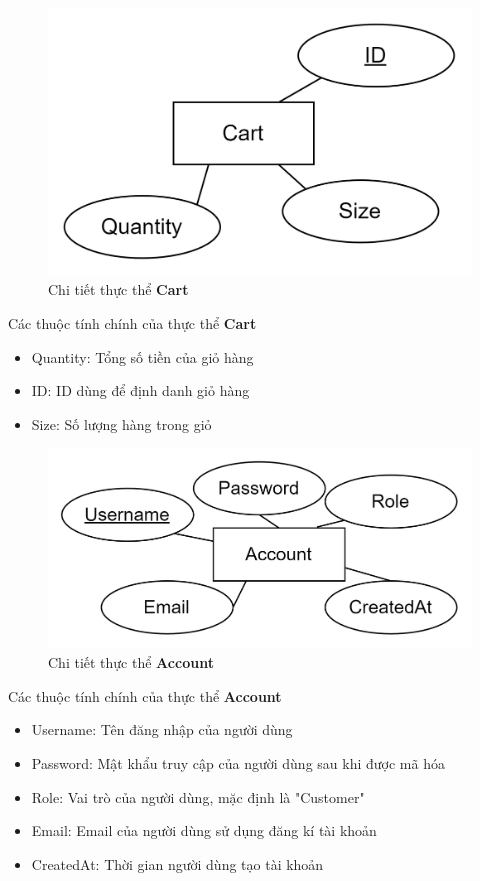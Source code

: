 \begin{figure}[h]
    \centering
    \includegraphics[scale = 0.20]{img/db/cart.png}
    \vspace{1cm}
    \caption{Chi tiết thực thể \textbf{Cart}}
    \label{fig:taskAssignment}
\end{figure}
Các thuộc tính chính của thực thể \textbf{Cart}
\begin{itemize}
    \item Quantity: Tổng số tiền của giỏ hàng
    \item ID: ID dùng để định danh giỏ hàng
    \item Size: Số lượng hàng trong giỏ
\end{itemize}


\begin{figure}[h]
    \centering
    \includegraphics[scale = 0.20]{img/db/account.png}
    \vspace{1cm}
    \caption{Chi tiết thực thể \textbf{Account}}
    \label{fig:taskAssignment}
\end{figure}
Các thuộc tính chính của thực thể \textbf{Account}
\begin{itemize}
    \item Username: Tên đăng nhập của người dùng
    \item Password: Mật khẩu truy cập của người dùng sau khi được mã hóa
    \item Role: Vai trò của người dùng, mặc định là "Customer"
    \item Email: Email của người dùng sử dụng đăng kí tài khoản
    \item CreatedAt: Thời gian người dùng tạo tài khoản 
\end{itemize}

